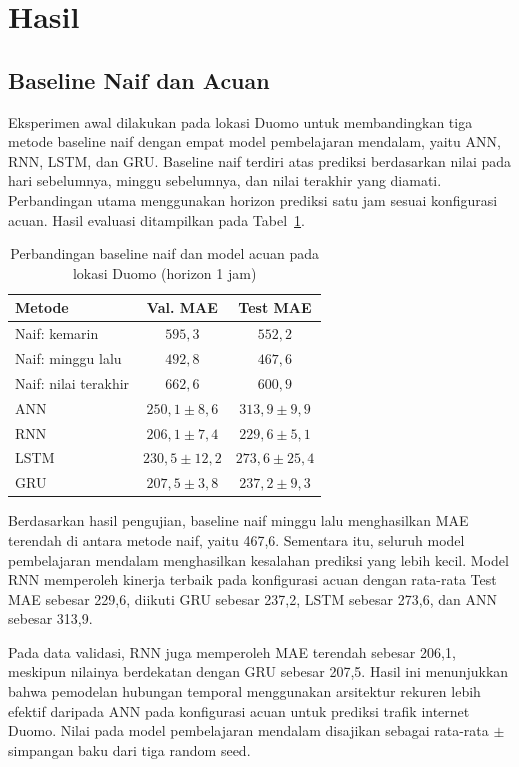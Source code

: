 \documentclass[conference,a4paper]{IEEEtran}
\begin{document}
\section{Hasil}

\subsection{Baseline Naif dan Acuan}
Eksperimen awal dilakukan pada lokasi Duomo untuk membandingkan tiga metode baseline naif dengan empat model pembelajaran mendalam, yaitu ANN, RNN, LSTM, dan GRU. Baseline naif terdiri atas prediksi berdasarkan nilai pada hari sebelumnya, minggu sebelumnya, dan nilai terakhir yang diamati. Perbandingan utama menggunakan horizon prediksi satu jam sesuai konfigurasi acuan. Hasil evaluasi ditampilkan pada Tabel~\ref{tab:baseline}.

\begin{table}[H]
\centering
\caption{Perbandingan baseline naif dan model acuan pada lokasi Duomo (horizon 1 jam)}
\label{tab:baseline}
\scriptsize
\begin{tabular}{@{}lcc@{}}
\toprule
Metode & Val. MAE & Test MAE \\
\midrule
Naif: kemarin & $595{,}3$ & $552{,}2$ \\
Naif: minggu lalu & $492{,}8$ & $467{,}6$ \\
Naif: nilai terakhir & $662{,}6$ & $600{,}9$ \\
\midrule
ANN & $250{,}1\pm8{,}6$ & $313{,}9\pm9{,}9$ \\
RNN & $206{,}1\pm7{,}4$ & $229{,}6\pm5{,}1$ \\
LSTM & $230{,}5\pm12{,}2$ & $273{,}6\pm25{,}4$ \\
GRU & $207{,}5\pm3{,}8$ & $237{,}2\pm9{,}3$ \\
\bottomrule
\end{tabular}
\end{table}

Berdasarkan hasil pengujian, baseline naif minggu lalu menghasilkan MAE terendah di antara metode naif, yaitu 467,6. Sementara itu, seluruh model pembelajaran mendalam menghasilkan kesalahan prediksi yang lebih kecil. Model RNN memperoleh kinerja terbaik pada konfigurasi acuan dengan rata-rata Test MAE sebesar 229,6, diikuti GRU sebesar 237,2, LSTM sebesar 273,6, dan ANN sebesar 313,9.

Pada data validasi, RNN juga memperoleh MAE terendah sebesar 206,1, meskipun nilainya berdekatan dengan GRU sebesar 207,5. Hasil ini menunjukkan bahwa pemodelan hubungan temporal menggunakan arsitektur rekuren lebih efektif daripada ANN pada konfigurasi acuan untuk prediksi trafik internet Duomo. Nilai pada model pembelajaran mendalam disajikan sebagai rata-rata $\pm$ simpangan baku dari tiga random seed.
\end{document}
